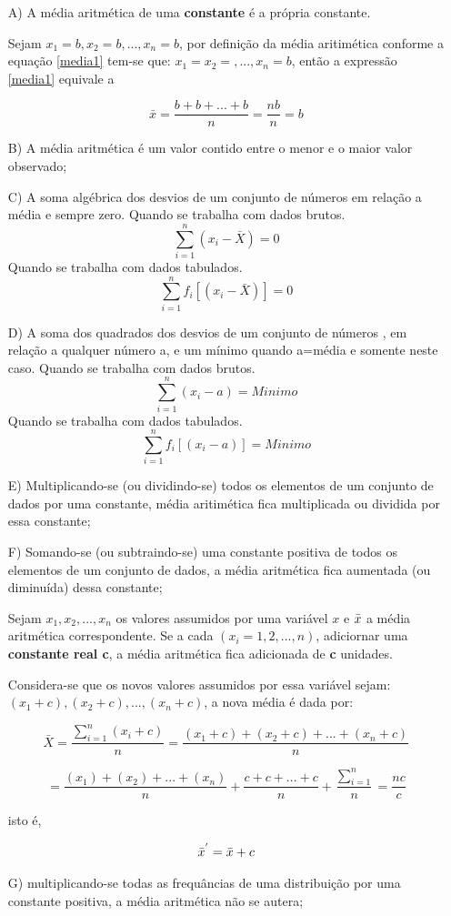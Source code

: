 \begin{enumerate}
\item [{A)}] A média aritmética de uma \textbf{constante} é a própria constante.

Sejam  $x_{1}=b, x_{2}=b, ..., x_{n}=b$, por definição da média aritimética conforme a equação \ref{media1} tem-se que: $x_{1}=x_{2}=,..., x_{n}=b$, então a expressão \ref{media1} equivale a

\begin{equation}\label{propriedade1}
\bar{x}=\frac{b+b+...+b}{n}=\frac{nb}{n}=b
\end{equation}
 

\item [{B)}] A média aritmética é um valor contido entre o menor e o maior valor observado; 
\item [{C)}] A soma algébrica dos desvios de um conjunto de números em relação a média e sempre zero.\vskip0.3cm
Quando se trabalha com dados brutos.
$$ \sum_{i=1}^{n}(x_{i}-\bar{X})=0 $$
Quando se trabalha com dados tabulados.
$$ \sum_{i=1}^{n}f_{i}[(x_{i}-\bar{X})]=0 $$
\item [{D)}] A soma dos quadrados dos desvios de um conjunto de números , em relação a qualquer número a, e um mínimo quando a=média e somente neste caso.\vskip0.3cm
Quando se trabalha com dados brutos.
$$ \sum_{i=1}^{n}(x_{i}- a)= Minimo  $$
Quando se trabalha com dados tabulados.
$$ \sum_{i=1}^{n}f_{i}[(x_{i}- a)]= Minimo  $$
  \item [{E)}] Multiplicando-se (ou dividindo-se) todos os elementos
de um conjunto de dados por uma constante, média aritimética fica multiplicada ou dividida por essa constante;
\item [{F)}] Somando-se (ou subtraindo-se) uma constante positiva de todos os elementos de um conjunto de dados, a média aritmética fica aumentada (ou diminuída) dessa constante;


Sejam $x_{1}, x_{2},...,x_{n}$ os valores assumidos por uma variável $x$ e $\Bar{x}$ a média aritmética correspondente. Se a cada $(x_{i}=1,2,...,n)$, adiciornar uma \textbf{constante real c}, a média aritmética fica adicionada de \textbf{c} unidades.\vskip0.3cm

Considera-se que os novos valores assumidos por essa variável sejam: $(x_{1}+c),(x_{2}+c),...,(x_{n}+c)$, a nova média é dada por:

\begin{equation}\label{media3}
     \bar{X}= \frac{\sum_{i=1}^{n}(x_{i}+c)}{n}=\frac{(x_{1}+c)+(x_{2}+c)+...+(x_{n}+c)}{n} 
\end{equation}

\begin{equation*}\label{media4}
  =\frac{(x_{1})+(x_{2})+...+(x_{n})}{n}+\frac{c+c+...+c}{n}+\frac{\sum_{i=1}^{n}}{n}=\frac{nc}{c}
\end{equation*}

isto é, 

$$\Bar{x}^{'}=\Bar{x}+c$$

\item [{G)}]multiplicando-se todas as frequâncias de uma distribuição por uma constante positiva, a média aritmética não se autera; 
\end{enumerate}

